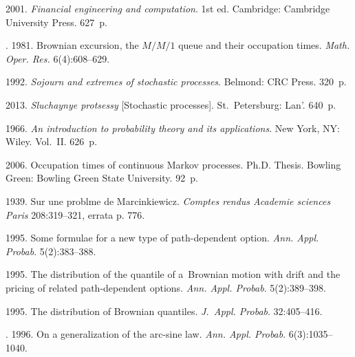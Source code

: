   \begin{multicols}{2}

\renewcommand{\bibname}{\protect\rmfamily References}

{\small\frenchspacing
 {%
 \begin{thebibliography}{99}

 2001. \textit{Financial engineering and computation}. 1st ed. Cambridge: Cambridge University Press. 627~p.

. 1981. Brownian excursion, the $M/M/1$ queue and their occupation times. \textit{Math. Oper. Res.} 6(4):608--629.

 1992. \textit{Sojourn and extremes of stochastic processes}. Belmond: CRC Press. 320~p.

 2013. \textit{Sluchaynye protsessy} [Stochastic processes]. St.\ Petersburg: Lan'. 640~p.

 1966. \textit{An introduction to probability theory and its applications}.  New York, NY: Wiley. Vol.~II. 626~p.

 2006. Occupation times of continuous Markov processes. Ph.D. Thesis. Bowling Green: Bowling Green State University. 92~p.

 1939. Sur une \mbox{probl{\fontsize{10pt}{10pt}\selectfont{}}me} de Marcinkiewicz. \textit{Comptes rendus Academie sciences Paris} 208:319--321, errata p. 776.


 1995. Some formulae for a new type of path-dependent option. \textit{Ann. Appl. Probab}. 5(2):383--388.

 1995. The distribution of the quantile of a~Brownian motion with drift and the pricing of related path-dependent options. \textit{Ann. Appl. Probab}. 5(2):389--398.

 1995. The distribution of Brownian quantiles. \textit{J.~Appl. Probab}. 32:405--416.

. 1996. On a generalization of the arc-sine law. \textit{Ann. Appl. Probab}. 6(3):1035--1040.


\end{thebibliography}}}
\end{multicols}
